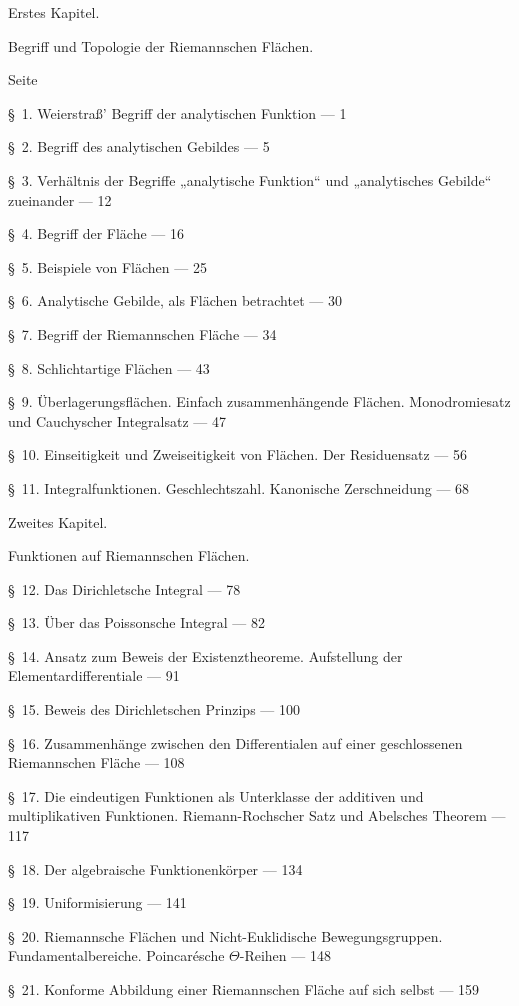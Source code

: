 \documentclass{article}
\begin{document}
Erstes Kapitel.

Begriff und Topologie der Riemannschen Flächen.

Seite

§~1. Weierstraß' Begriff der analytischen Funktion --- 1

§~2. Begriff des analytischen Gebildes --- 5

§~3. Verhältnis der Begriffe „analytische Funktion“ und „analytisches Gebilde“ zueinander --- 12

§~4. Begriff der Fläche --- 16

§~5. Beispiele von Flächen --- 25

§~6. Analytische Gebilde, als Flächen betrachtet --- 30

§~7. Begriff der Riemannschen Fläche --- 34

§~8. Schlichtartige Flächen --- 43

§~9. Überlagerungsflächen. Einfach zusammenhängende Flächen. Monodromiesatz und Cauchyscher Integralsatz --- 47

§~10. Einseitigkeit und Zweiseitigkeit von Flächen. Der Residuensatz --- 56

§~11. Integralfunktionen. Geschlechtszahl. Kanonische Zerschneidung --- 68

Zweites Kapitel.

Funktionen auf Riemannschen Flächen.

§~12. Das Dirichletsche Integral --- 78

§~13. Über das Poissonsche Integral --- 82

§~14. Ansatz zum Beweis der Existenztheoreme. Aufstellung der Elementardifferentiale --- 91

§~15. Beweis des Dirichletschen Prinzips --- 100

§~16. Zusammenhänge zwischen den Differentialen auf einer geschlossenen Riemannschen Fläche --- 108

§~17. Die eindeutigen Funktionen als Unterklasse der additiven und multiplikativen Funktionen. Riemann-Rochscher Satz und Abelsches Theorem --- 117

§~18. Der algebraische Funktionenkörper --- 134

§~19. Uniformisierung --- 141

§~20. Riemannsche Flächen und Nicht-Euklidische Bewegungsgruppen. Fundamentalbereiche. Poincarésche $\Theta$-Reihen --- 148

§~21. Konforme Abbildung einer Riemannschen Fläche auf sich selbst --- 159
\end{document}
